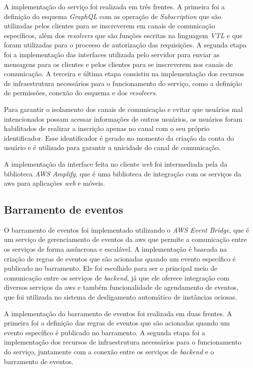 A implementação do serviço foi realizada em três frentes. A primeira foi a definição do esquema \textit{GraphQL} com as operação de \textit{Subscription} que são utilizadas pelos clientes para se inscreverem em canais de comunicação específicos, além dos \textit{resolvers} que são funções escritas na linguagem \textit{VTL} e que foram utilizadas para o processo de autorização das requisições. A segunda etapa foi a implementação das interfaces utilizada pelo servidor para enviar as mensagens para os clientes e pelos clientes para se inscreverem nos canais de comunicação. A terceira e última etapa consistiu na implementação dos recursos de infraestrutura necessários para o funcionamento do serviço, como a definição de permissões, conexão do esquema e dos \textit{resolvers}.

Para garantir o isolamento dos canais de comunicação e evitar que usuários mal intencionados possam acessar informações de outros usuários, os usuários foram habilitados de realizar a inscrição apenas no canal com o seu próprio identificador. Esse identificador é gerado no momento da criação da conta do usuário e é utilizado para garantir a unicidade do canal de comunicação.

A implementação da interface feita no cliente \textit{web} foi intermediada pela da biblioteca \textit{AWS Amplify}, que é uma biblioteca de integração com os serviços da \gls{aws} para aplicações \textit{web} e móveis.

\subsection{Barramento de eventos}
\label{subsec:barramentoDeEventos}

O barramento de eventos foi implementado utilizando o \textit{AWS Event Bridge}, que é um serviço de gerenciamento de eventos da \gls{aws} que permite a comunicação entre os serviços de forma assíncrona e escalável. A implementação é baseada na criação de regras de eventos que são acionadas quando um evento específico é publicado no barramento. Ele foi escolhido para ser o principal meio de comunicação entre os serviços de \textit{backend}, já que ele oferece integração com diversos serviços da \gls{aws} e também funcionalidade de agendamento de eventos, que foi utilizada no sistema de desligamento automático de instâncias ociosas.

A implementação do barramento de eventos foi realizada em duas frentes. A primeira foi a definição das regras de eventos que são acionadas quando um evento específico é publicado no barramento. A segunda etapa foi a implementação dos recursos de infraestrutura necessários para o funcionamento do serviço, juntamente com a conexão entre os serviços de \textit{backend} e o barramento de eventos.

